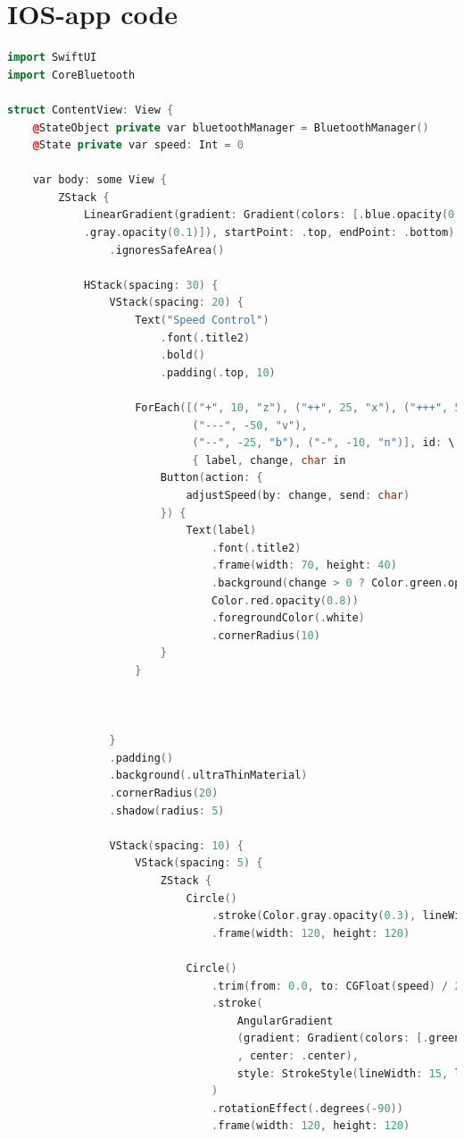 \section{IOS-app code}
\label{swift_code}
\begin{lstlisting}[language=c++]
import SwiftUI
import CoreBluetooth

struct ContentView: View {
    @StateObject private var bluetoothManager = BluetoothManager()
    @State private var speed: Int = 0

    var body: some View {
        ZStack {
            LinearGradient(gradient: Gradient(colors: [.blue.opacity(0.1), 
            .gray.opacity(0.1)]), startPoint: .top, endPoint: .bottom)
                .ignoresSafeArea()

            HStack(spacing: 30) {
                VStack(spacing: 20) {
                    Text("Speed Control")
                        .font(.title2)
                        .bold()
                        .padding(.top, 10)

                    ForEach([("+", 10, "z"), ("++", 25, "x"), ("+++", 50, "c"),
                             ("---", -50, "v"),
                             ("--", -25, "b"), ("-", -10, "n")], id: \.0)
                             { label, change, char in
                        Button(action: {
                            adjustSpeed(by: change, send: char)
                        }) {
                            Text(label)
                                .font(.title2)
                                .frame(width: 70, height: 40)
                                .background(change > 0 ? Color.green.opacity(0.8) : 
                                Color.red.opacity(0.8))
                                .foregroundColor(.white)
                                .cornerRadius(10)
                        }
                    }



                }
                .padding()
                .background(.ultraThinMaterial)
                .cornerRadius(20)
                .shadow(radius: 5)

                VStack(spacing: 10) {
                    VStack(spacing: 5) {
                        ZStack {
                            Circle()
                                .stroke(Color.gray.opacity(0.3), lineWidth: 15)
                                .frame(width: 120, height: 120)

                            Circle()
                                .trim(from: 0.0, to: CGFloat(speed) / 255)
                                .stroke(
                                    AngularGradient
                                    (gradient: Gradient(colors: [.green, .yellow, .red])
                                    , center: .center),
                                    style: StrokeStyle(lineWidth: 15, lineCap: .round)
                                )
                                .rotationEffect(.degrees(-90))
                                .frame(width: 120, height: 120)


\end{lstlisting}
